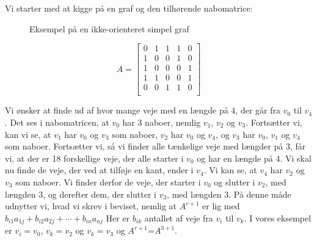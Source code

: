 \begin{exmp}
Vi starter med at kigge på en graf og den tilhørende nabomatrice:
\begin{figure}[H]
\centering
	\caption{Eksempel på en ikke-orienteret simpel graf}
	\label{fig.vaegtetopg}
\end{figure}


\begin{equation}
A=\begin{bmatrix}
    0&1&1&1&0\\
    1&0&0&1&0\\
    1&0&0&0&1\\
    1&1&0&0&1\\
    0&0&1&1&0\\
\end{bmatrix}
\end{equation}


Vi ønsker at finde ud af hvor mange veje med en længde på 4, der går fra $v_0$ til $v_4$. Det ses i nabomatricen, at $v_0$ har 3 naboer, nemlig $v_1$, $v_2$ og $v_3$. Fortsætter vi, kan vi se, at $v_1$ har $v_0$ og $v_3$ som naboer, $v_2$ har $v_0$ og $v_4$, og $v_3$ har $v_0$, $v_1$ og $v_4$ som naboer. Fortsætter vi, så vi finder alle tænkelige veje med længder på 3, får vi, at der er 18 forskellige veje, der alle starter i $v_0$ og har en længde på 4. Vi skal nu finde de veje, der ved at tilføje en kant, ender i $v_4$. Vi kan se, at $v_4$ har $v_2$ og $v_3$ som naboer. Vi finder derfor de veje, der starter i $v_0$ og slutter i $v_2$, med længden 3, og derefter dem, der slutter i $v_3$, med længden 3. På denne måde udnytter vi, hvad vi skrev i beviset, nemlig at
\textbf{$A^{r+1}$} er lig med $b_{i1}a_{1j} + b_{i2}a_{2j} +\cdots+ b_{in}a_{nj}$
Her er $b_{ik}$ antallet af veje fra $v_{i}$ til ${v_k}$. I vores eksempel er $v_{i}=v_{0}$, ${v_k}=v_{2}$ og ${v_k}=v_{3}$ og \textbf{$A^{r+1}$}=\textbf{$A^{3+1}$}. 
 

\end{exmp}
